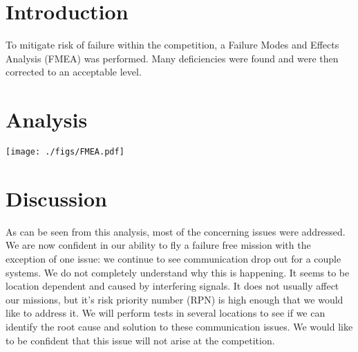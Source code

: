 \documentclass[]{auvsi_doc}
\begin{document}
\begin{AUVSITitlePage}
\begin{artifacttable}
\end{artifacttable}
\end{AUVSITitlePage}
\vspace*{-2cm}
\section{Introduction}
\vspace*{-0.5cm}
To mitigate risk of failure within the competition, a Failure Modes and Effects Analysis (FMEA) was performed. Many deficiencies were found and were then corrected to an acceptable level.
\vspace*{-0.5cm}
\section{Analysis}
\vspace*{-0.5cm}
\hspace*{-1.54cm}
\texttt{[image: ./figs/FMEA.pdf]}
\label{fig:reqMat}

\section{Discussion}
As can be seen from this analysis, most of the concerning issues were addressed. We are now confident in our ability to fly a failure free mission with the exception of one issue: we continue to see communication drop out for a couple systems. We do not completely understand why this is happening. It seems to be location dependent and caused by interfering signals. It does not usually affect our missions, but it's risk priority number (RPN) is high enough that we would like to address it. We will perform tests in several locations to see if we can identify the root cause and solution to these communication issues. We would like to be confident that this issue will not arise at the competition.
\end{document}
